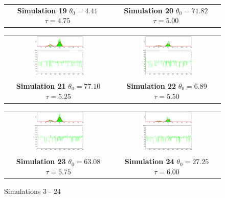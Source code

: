 \begin{figure}
\begin{tabular}{cc}
\textbf{Simulation 19} $\theta_0=    4.41$  $\tau=    4.75$  & \textbf{Simulation 20} $\theta_0=   71.82$  $\tau=    5.00$
\end{tabular}
\begin{tabular}{cc} 
\includegraphics[width=0.5\textwidth]{ImaginiLatex/MetropolisExample21.eps} &
\includegraphics[width=0.5\textwidth]{ImaginiLatex/MetropolisExample22.eps} \\
\textbf{Simulation 21} $\theta_0=   77.10$  $\tau=    5.25$  & \textbf{Simulation 22} $\theta_0=    6.89$  $\tau=    5.50$
\end{tabular}
\begin{tabular}{cc} 
\includegraphics[width=0.5\textwidth]{ImaginiLatex/MetropolisExample23.eps} &
\includegraphics[width=0.5\textwidth]{ImaginiLatex/MetropolisExample24.eps} \\
\textbf{Simulation 23} $\theta_0=   63.08$  $\tau=    5.75$  & \textbf{Simulation 24} $\theta_0=   27.25$  $\tau=    6.00$
\end{tabular}
\caption{Simulations 3 - 24}
\end{figure}

